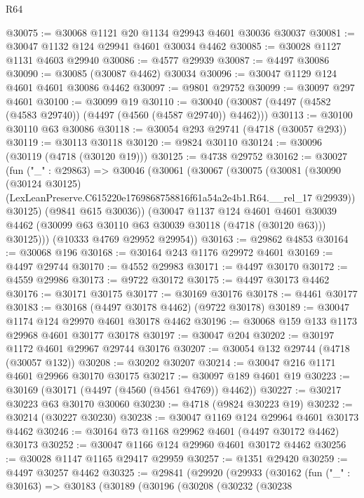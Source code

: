 \begin{lexlean}{R64}
\begin{coremodule}
@30075 := @30068 @1121 @20 @1134 @29943 @4601 @30036 @30037
@30081 := @30047 @1132 @124 @29941 @4601 @30034 @4462
@30085 := @30028 @1127 @1131 @4603 @29940
@30086 := @4577 @29939
@30087 := @4497 @30086
@30090 := @30085 (@30087 @4462) @30034
@30096 := @30047 @1129 @124 @4601 @4601 @30086 @4462
@30097 := @9801 @29752
@30099 := @30097 @297 @4601
@30100 := @30099 @19
@30110 := @30040 (@30087 (@4497 (@4582 (@4583 @29740)) (@4497 (@4560 (@4587 @29740)) @4462)))
@30113 := @30100 @30110 @63 @30086
@30118 := @30054 @293 @29741 (@4718 (@30057 @293))
@30119 := @30113 @30118
@30120 := @9824 @30110
@30124 := @30096 (@30119 (@4718 (@30120 @19)))
@30125 := @4738 @29752
@30162 := @30027
    (fun ("_" : @29863) =>
    @30046
      (@30061
        (@30067
          (@30075
            (@30081
              (@30090
                (@30124 @30125)
                (LexLeanPreserve.C615220e1769868758816f61a54a2e4b1.R64.__rel_17 @29939))
              @30125)
            (@9841 @615 @30036))
          (@30047
            @1137
            @124
            @4601
            @4601
            @30039
            @4462
            (@30099 @63 @30110 @63 @30039 @30118 (@4718 (@30120 @63)))
            @30125)))
      (@10333 @4769 @29952 @29954))
@30163 := @29862 @4853
@30164 := @30068 @196
@30168 := @30164 @243 @1176 @29972 @4601
@30169 := @4497 @29744
@30170 := @4552 @29983
@30171 := @4497 @30170
@30172 := @4559 @29986
@30173 := @9722 @30172
@30175 := @4497 @30173 @4462
@30176 := @30171 @30175
@30177 := @30169 @30176
@30178 := @4461 @30177
@30183 := @30168 (@4497 @30178 @4462) (@9722 @30178)
@30189 := @30047 @1174 @124 @29970 @4601 @30178 @4462
@30196 := @30068 @159 @133 @1173 @29968 @4601 @30177 @30178
@30197 := @30047 @204
@30202 := @30197 @1172 @4601 @29967 @29744 @30176
@30207 := @30054 @132 @29744 (@4718 (@30057 @132))
@30208 := @30202 @30207
@30214 := @30047 @216 @1171 @4601 @29966 @30170 @30175
@30217 := @30097 @189 @4601 @19
@30223 := @30169 (@30171 (@4497 (@4560 (@4561 @4769)) @4462))
@30227 := @30217 @30223 @63 @30170 @30060
@30230 := @4718 (@9824 @30223 @19)
@30232 := @30214 (@30227 @30230)
@30238 := @30047 @1169 @124 @29964 @4601 @30173 @4462
@30246 := @30164 @73 @1168 @29962 @4601 (@4497 @30172 @4462) @30173
@30252 := @30047 @1166 @124 @29960 @4601 @30172 @4462
@30256 := @30028 @1147 @1165 @29417 @29959
@30257 := @1351 @29420
@30259 := @4497 @30257 @4462
@30325 := @29841
    (@29920
      (@29933
        (@30162
          (fun ("_" : @30163) =>
          @30183
            (@30189
              (@30196
                (@30208
                  (@30232
                    (@30238

\end{coremodule}
\end{lexlean}
